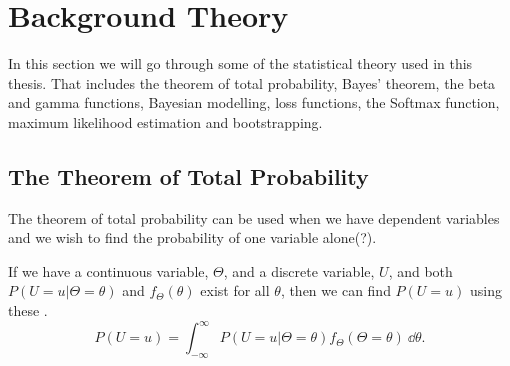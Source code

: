 \newpage
\chapter{Background Theory}
In this section we will go through some of the statistical theory used in this thesis. That includes the theorem of total probability, Bayes' theorem, the beta and gamma functions, Bayesian modelling, loss functions, the Softmax function, maximum likelihood estimation and bootstrapping.  

\section{The Theorem of Total Probability}
The theorem of total probability can be used when we have dependent variables and we wish to find the probability of one variable alone(?).
\begin{theorem}
If we have a continuous variable, $\Theta$, and a discrete variable, $U$, and both $P(U=u|\Theta=\theta)$ and  $f_\Theta(\theta)$ exist for all $\theta$, then we can find $P(U=u)$ using these \citep{schay2016introduction}. 
\begin{equation}
    \label{lawoftotprob}
    P(U=u) = \int_{-\infty}^{\infty} P(U=u|\Theta=\theta)f_{\Theta}(\Theta=\theta) \: \dd \theta.
\end{equation}
\end{theorem}

\begin{comment}
In \citet{schay2016introduction}, the theorem of total probability for continuous variables is stated as 
\begin{theorem}[Theorem of Total Probability, Continuous Versions]
 For a continuous random variable Y and any event A, if $f_{Y|A}$ and $f_Y$ exists for all y, then
\begin{equation}
    P(A) = \int_{-\infty}^{\infty}
    P(A|Y=y)f_Y(y) dy.
\end{equation}
\end{theorem}
\end{comment}




